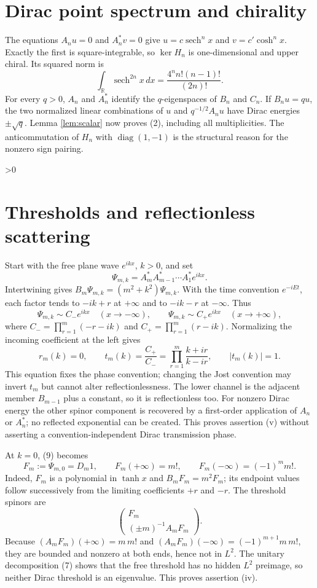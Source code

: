 \documentclass[10pt]{article}
\providecommand{\CRevisionRound}{2}
\theoremstyle{remark}
\newcommand{\R}{\mathbb R}
\newcommand{\sech}{\operatorname{sech}}
\begin{document}
\section{Dirac point spectrum and chirality}

The equations $A_nu=0$ and $A_n^*v=0$ give
$u=c\sech^nx$ and $v=c'\cosh^nx$.  Exactly the first is square-integrable,
so $\ker H_n$ is one-dimensional and upper chiral.  Its squared norm is
\[
 \int_{\R}\sech^{2n}x\,dx
 =\frac{4^n n!(n-1)!}{(2n)!}.                            \tag{8}
\]
For every $q>0$, $A_n$ and $A_n^*$ identify the $q$-eigenspaces of
$B_n$ and $C_n$.  If $B_nu=qu$, the two normalized linear combinations of
$u$ and $q^{-1/2}A_nu$ have Dirac energies $\pm\sqrt q$.  Lemma
\ref{lem:scalar} now proves (2), including all multiplicities.  The
anticommutation of $H_n$ with $\operatorname{diag}(1,-1)$ is the structural
reason for the nonzero sign pairing.

\ifnum\CRevisionRound>0
\section{Thresholds and reflectionless scattering}\label{sec:scattering}

Start with the free plane wave $e^{ikx}$, $k>0$, and set
\[
 \Psi_{m,k}=A_m^*A_{m-1}^*\cdots A_1^*e^{ikx}.           \tag{9}
\]
Intertwining gives $B_m\Psi_{m,k}=(m^2+k^2)\Psi_{m,k}$.
With the time convention $e^{-iEt}$, each factor tends to $-ik+r$ at
$+\infty$ and to $-ik-r$ at $-\infty$.  Thus
\[
 \Psi_{m,k}\sim C_-e^{ikx}\quad(x\to-\infty),\qquad
 \Psi_{m,k}\sim C_+e^{ikx}\quad(x\to+\infty),
\]
where $C_-=\prod_{r=1}^m(-r-ik)$ and
$C_+=\prod_{r=1}^m(r-ik)$.  Normalizing the incoming coefficient at the
left gives
\begin{equation}
 r_m(k)=0,\qquad
 t_m(k)=\frac{C_+}{C_-}
 =\prod_{r=1}^m\frac{k+ir}{k-ir},\qquad |t_m(k)|=1.       \tag{10}
\end{equation}
This equation fixes the phase convention; changing the Jost convention
may invert $t_m$ but cannot alter reflectionlessness.  The lower channel is
the adjacent member $B_{m-1}$ plus a constant, so it is reflectionless too.
For nonzero Dirac energy the other spinor component is recovered by a
first-order application of $A_n$ or $A_n^*$; no reflected exponential can
be created.  This proves assertion (v) without asserting a
convention-independent Dirac transmission phase.

At $k=0$, (9) becomes
\[
 F_m:=\Psi_{m,0}=D_m1,\qquad
 F_m(+\infty)=m!,\qquad F_m(-\infty)=(-1)^m m!.
\]
Indeed, $F_m$ is a polynomial in $\tanh x$ and
$B_mF_m=m^2F_m$; its endpoint values follow successively from the limiting
coefficients $+r$ and $-r$.  The threshold spinors are
\[
 \begin{pmatrix}F_m\\ (\pm m)^{-1}A_mF_m\end{pmatrix}.
\]
Because $(A_mF_m)(+\infty)=m\,m!$ and
$(A_mF_m)(-\infty)=(-1)^{m+1}m\,m!$, they are bounded and nonzero at both
ends, hence not in $L^2$.  The unitary decomposition (7) shows that the
free threshold has no hidden $L^2$ preimage, so neither Dirac threshold is
an eigenvalue.  This proves assertion (iv).
\fi
\end{document}
